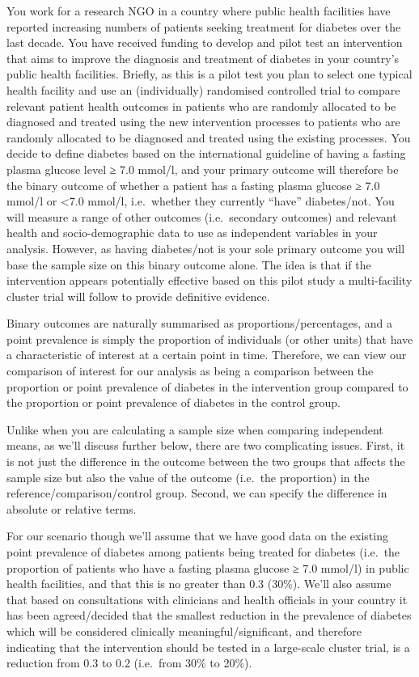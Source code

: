 \documentclass[
]{book}
\begin{document}
You work for a research NGO in a country where public health facilities have reported increasing numbers of patients seeking treatment for diabetes over the last decade. You have received funding to develop and pilot test an intervention that aims to improve the diagnosis and treatment of diabetes in your country's public health facilities. Briefly, as this is a pilot test you plan to select one typical health facility and use an (individually) randomised controlled trial to compare relevant patient health outcomes in patients who are randomly allocated to be diagnosed and treated using the new intervention processes to patients who are randomly allocated to be diagnosed and treated using the existing processes. You decide to define diabetes based on the international guideline of having a fasting plasma glucose level ≥ 7.0 mmol/l, and your primary outcome will therefore be the binary outcome of whether a patient has a fasting plasma glucose ≥ 7.0 mmol/l or \textless7.0 mmol/l, i.e.~whether they currently ``have'' diabetes/not. You will measure a range of other outcomes (i.e.~secondary outcomes) and relevant health and socio-demographic data to use as independent variables in your analysis. However, as having diabetes/not is your sole primary outcome you will base the sample size on this binary outcome alone. The idea is that if the intervention appears potentially effective based on this pilot study a multi-facility cluster trial will follow to provide definitive evidence.

Binary outcomes are naturally summarised as proportions/percentages, and a point prevalence is simply the proportion of individuals (or other units) that have a characteristic of interest at a certain point in time. Therefore, we can view our comparison of interest for our analysis as being a comparison between the proportion or point prevalence of diabetes in the intervention group compared to the proportion or point prevalence of diabetes in the control group.

Unlike when you are calculating a sample size when comparing independent means, as we'll discuss further below, there are two complicating issues. First, it is not just the difference in the outcome between the two groups that affects the sample size but also the value of the outcome (i.e.~the proportion) in the reference/comparison/control group. Second, we can specify the difference in absolute or relative terms.

For our scenario though we'll assume that we have good data on the existing point prevalence of diabetes among patients being treated for diabetes (i.e.~the proportion of patients who have a fasting plasma glucose ≥ 7.0 mmol/l) in public health facilities, and that this is no greater than 0.3 (30\%). We'll also assume that based on consultations with clinicians and health officials in your country it has been agreed/decided that the smallest reduction in the prevalence of diabetes which will be considered clinically meaningful/significant, and therefore indicating that the intervention should be tested in a large-scale cluster trial, is a reduction from 0.3 to 0.2 (i.e.~from 30\% to 20\%).
\end{document}
